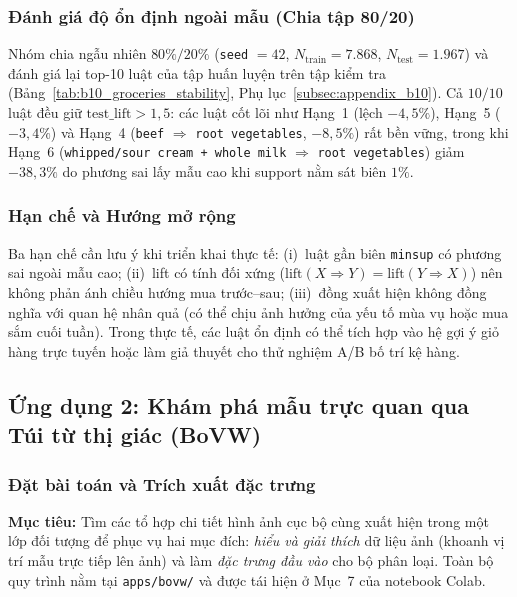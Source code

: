 \subsubsection{Đánh giá độ ổn định ngoài mẫu (Chia tập 80/20)}
Nhóm chia ngẫu nhiên $80\%/20\%$ (\texttt{seed} $= 42$, $N_{\text{train}} = 7.868$, $N_{\text{test}} = 1.967$) và đánh giá lại top-10 luật của tập huấn luyện trên tập kiểm tra (Bảng~\ref{tab:b10_groceries_stability}, Phụ lục~\ref{subsec:appendix_b10}). Cả $10/10$ luật đều giữ $\mathrm{test\_lift} > 1{,}5$: các luật cốt lõi như Hạng~1 (lệch $-4{,}5\%$), Hạng~5 ($-3{,}4\%$) và Hạng~4 (\texttt{beef} $\Rightarrow$ \texttt{root vegetables}, $-8{,}5\%$) rất bền vững, trong khi Hạng~6 (\texttt{whipped/sour cream + whole milk} $\Rightarrow$ \texttt{root vegetables}) giảm $-38{,}3\%$ do phương sai lấy mẫu cao khi support nằm sát biên $1\%$.

\subsubsection{Hạn chế và Hướng mở rộng}
Ba hạn chế cần lưu ý khi triển khai thực tế: (i)~luật gần biên \texttt{minsup} có phương sai ngoài mẫu cao; (ii)~lift có tính đối xứng ($\mathrm{lift}(X \Rightarrow Y) = \mathrm{lift}(Y \Rightarrow X)$) nên không phản ánh chiều hướng mua trước--sau; (iii)~đồng xuất hiện không đồng nghĩa với quan hệ nhân quả (có thể chịu ảnh hưởng của yếu tố mùa vụ hoặc mua sắm cuối tuần). Trong thực tế, các luật ổn định có thể tích hợp vào hệ gợi ý giỏ hàng trực tuyến hoặc làm giả thuyết cho thử nghiệm A/B bố trí kệ hàng.

\subsection{Ứng dụng 2: Khám phá mẫu trực quan qua Túi từ thị giác (BoVW)}
\label{subsec:app2_bovw}

\subsubsection{Đặt bài toán và Trích xuất đặc trưng}
\textbf{Mục tiêu:} Tìm các tổ hợp chi tiết hình ảnh cục bộ cùng xuất hiện trong một lớp đối tượng để phục vụ hai mục đích: \emph{hiểu và giải thích} dữ liệu ảnh (khoanh vị trí mẫu trực tiếp lên ảnh) và làm \emph{đặc trưng đầu vào} cho bộ phân loại. Toàn bộ quy trình nằm tại \texttt{apps/bovw/} và được tái hiện ở Mục~7 của notebook Colab.

